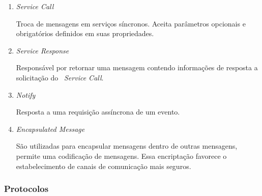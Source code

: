 	\begin{enumerate}
	  	\item \textit{Service Call}
		
			Troca de mensagens em serviços síncronos. Aceita parâmetros opcionais e obrigatórios definidos
			em suas propriedades.
		
		\item \textit{Service Response}
			
			Responsável por retornar uma mensagem contendo informações de resposta a solicitação do
			~\textit{Service Call}.
		
		\item \textit{Notify}
		
			Resposta a uma requisição assíncrona de um evento.
	
		\item \textit{Encapsulated Message}
		
			São utilizadas para encapsular mensagens dentro de outras mensagens, permite uma codificação de
			mensagens. Essa encriptação favorece o estabelecimento de canais de comunicação mais seguros.
	
	\end{enumerate} 
	
	
	
	\subsubsection{Protocolos}
	
	
	
	
	
	
	
	
	
	